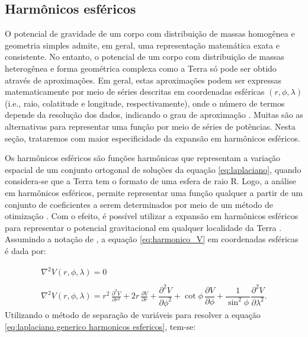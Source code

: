 \subsection{Harmônicos esféricos}

O potencial de gravidade de um corpo com distribuição de massas homogênea e  geometria simples admite, em geral, uma representação matemática exata e consistente. No entanto, o potencial de um corpo com distribuição de massas heterogênea e forma geométrica complexa como a Terra só pode ser obtido através de aproximações. Em geral, estas aproximações podem ser expressas matematicamente por meio de séries descritas em coordenadas esféricas $(r,\phi,\lambda)$ (i.e., raio, colatitude e longitude, respectivamente), onde o número de termos depende da resolução dos dados, indicando o grau de aproximação \cite{modelagem_matematica2,molina}. Muitas são as alternativas para representar uma função por meio de séries de potências. Nesta seção, trataremos com maior especificidade da expansão em harmônicos esféricos.

Os harmônicos esféricos são funções harmônicas que representam a variação espacial de um conjunto ortogonal de soluções da equação \ref{eq:laplaciano}, quando considera-se que a Terra tem o formato de uma esfera de raio R. Logo, a análise em harmônicos esféricos, permite representar uma função qualquer a partir de um conjunto de coeficientes a serem determinados por meio de um método de otimização \cite{torge2001geodesy, menke2018geophysical}. Com o efeito, é possível utilizar a expansão em harmônicos esféricos para representar o potencial gravitacional em qualquer localidade da Terra \cite{blakely1996,barthelmes2009}. Assumindo a notação de , a equação \ref{eq:harmonico_V} em coordenadas esféricas é dada por:

\begin{equation}
\label{eq:laplaciano generico harmonicos esfericos}
\begin{gathered}
\displaystyle {\nabla^{2}V(r,\phi, \lambda)=0} \\ \\
\displaystyle {\nabla^{2}V(r,\phi, \lambda)={{r^{2}\,} {\frac{\partial^{2}V}{\partial r^{2}}} + {2r\,}{\frac{\partial V}{\partial r}} + {\dfrac{\partial^{2}V}{\partial \phi^{2}} + {\cot\phi\,}{\dfrac{\partial V}{\partial \phi}} + {\dfrac{1}{\sin^{2}\phi\,}{\dfrac{\partial^{2}V}{\partial \lambda^{2}}}}}}}.
\end{gathered}
\end{equation} Utilizando o método de separação de variáveis para resolver a equação \ref{eq:laplaciano generico harmonicos esfericos}, tem-se:

